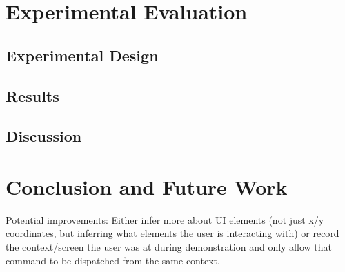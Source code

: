 \documentclass[letterpaper]{article}
\begin{document}
\section{Experimental Evaluation}
\subsection{Experimental Design}

\subsection{Results}

\subsection{Discussion}

\section{Conclusion and Future Work}
Potential improvements: Either infer more about UI elements (not just 
x/y coordinates, but inferring what elements the user is interacting with)
or record the context/screen the user was at during demonstration and only allow 
that command to be dispatched from the same context.
\end{document}
